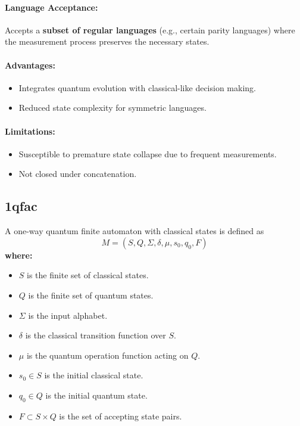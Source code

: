 \paragraph{Language Acceptance:}  
Accepts a \textbf{subset of regular languages} (e.g., certain parity languages) where the measurement process preserves the necessary states.

\paragraph{Advantages:}
\begin{itemize}
    \item Integrates quantum evolution with classical-like decision making.
    \item Reduced state complexity for symmetric languages.
\end{itemize}

\paragraph{Limitations:}
\begin{itemize}
    \item Susceptible to premature state collapse due to frequent measurements.
    \item Not closed under concatenation.
\end{itemize}

\subsection{\acrfull{1qfac}}
\label{subsec:1qfac}
\begin{definition}
A one-way quantum finite automaton with classical states is defined as 
\[
M = (S, Q, \Sigma, \delta, \mu, s_0, q_0, F)
\]
\textbf{where:}
\begin{itemize}
    \item \( S \) is the finite set of classical states.
    \item \( Q \) is the finite set of quantum states.
    \item \( \Sigma \) is the input alphabet.
    \item \( \delta \) is the classical transition function over \( S \).
    \item \( \mu \) is the quantum operation function acting on \( Q \).
    \item \( s_0 \in S \) is the initial classical state.
    \item \( q_0 \in Q \) is the initial quantum state.
    \item \( F \subset S \times Q \) is the set of accepting state pairs.
\end{itemize}
\end{definition}

